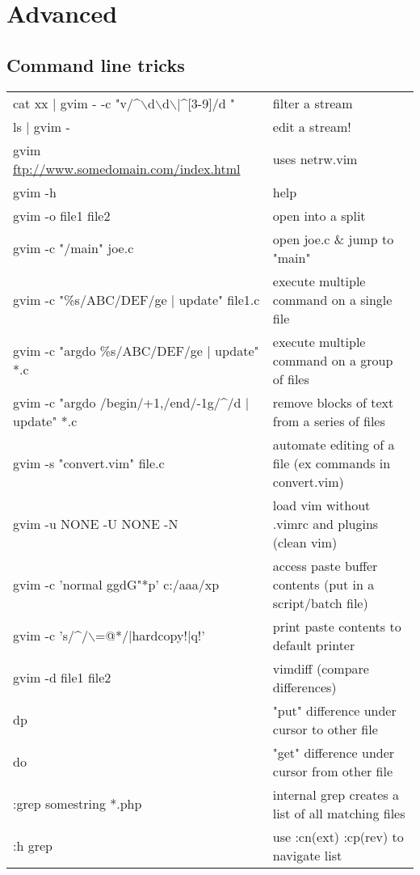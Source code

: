 \section{Advanced}

\subsection{Command line tricks}
\begin{center}
\begin{longtable}{l|l}
cat xx $|$ gvim - -c "v/\^{}$\backslash$d$\backslash$d$\backslash$$|$\^{}[3-9]/d " & filter a stream\\
ls $|$ gvim - & edit a stream!\\
gvim \url{ftp://www.somedomain.com/index.html} & uses netrw.vim\\
gvim -h & help\\
gvim -o file1 file2 & open into a split\\
gvim -c "/main" joe.c & open joe.c \& jump to "main"\\
gvim -c "\%s/ABC/DEF/ge $|$ update" file1.c & execute multiple command on a single file\\
gvim -c "argdo \%s/ABC/DEF/ge $|$ update" *.c & execute multiple command on a group of files\\
gvim -c "argdo /begin/+1,/end/-1g/\^{}/d $|$ update" *.c & remove blocks of text from a series of files\\
gvim -s "convert.vim" file.c & automate editing of a file (ex commands in convert.vim)\\
gvim -u NONE -U NONE -N & load vim without .vimrc and plugins (clean vim)\\
gvim -c 'normal ggdG"*p' c:/aaa/xp & access paste buffer contents (put in a script/batch file)\\
gvim -c 's/\^{}/$\backslash$=@*/$|$hardcopy!$|$q!' & print paste contents to default printer\\
gvim -d file1 file2 & vimdiff (compare differences)\\
dp & "put" difference under cursor to other file\\
do & "get" difference under cursor from other file\\
:grep somestring *.php & internal grep creates a list of all matching files\\
:h grep & use :cn(ext) :cp(rev) to navigate list
\end{longtable}
\end{center}

